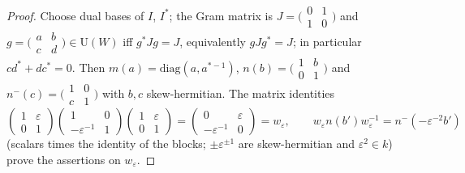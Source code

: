 \documentclass[10pt]{amsart}
\theoremstyle{definition}
\theoremstyle{remark}
\providecommand{\auU}{\mathrm U}
\begin{document}
\begin{proof}
Choose dual bases of $I$, $I^*$; the Gram matrix is $J=\bigl(\begin{smallmatrix}0&1\\1&0
\end{smallmatrix}\bigr)$ and $g=\bigl(\begin{smallmatrix}a&b\\c&d\end{smallmatrix}\bigr)\in\auU(W)$
iff $g^*Jg=J$, equivalently $gJg^*=J$; in particular $cd^*+dc^*=0$. Then $m(a)=\mathrm{diag}(a,
a^{*-1})$, $n(b)=\bigl(\begin{smallmatrix}1&b\\0&1\end{smallmatrix}\bigr)$ and $n^-(c)=
\bigl(\begin{smallmatrix}1&0\\c&1\end{smallmatrix}\bigr)$ with $b,c$ skew-hermitian. The matrix
identities
\[
\begin{pmatrix}1&\varepsilon\\0&1\end{pmatrix}\begin{pmatrix}1&0\\-\varepsilon^{-1}&1\end{pmatrix}
\begin{pmatrix}1&\varepsilon\\0&1\end{pmatrix}=\begin{pmatrix}0&\varepsilon\\-\varepsilon^{-1}&0
\end{pmatrix}=w_\varepsilon,\qquad w_\varepsilon n(b')w_\varepsilon^{-1}=n^-(-\varepsilon^{-2}b')
\]
(scalars times the identity of the blocks; $\pm\varepsilon^{\pm1}$ are skew-hermitian and
$\varepsilon^2\in k$) prove the assertions on $w_\varepsilon$.


\end{proof}
\end{document}
